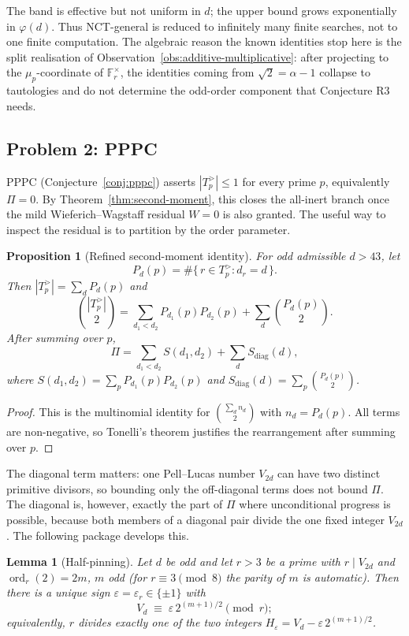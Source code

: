 \documentclass[11pt]{amsart}
\theoremstyle{plain}
\newtheorem{proposition}[theorem]{Proposition}
\newtheorem{lemma}[theorem]{Lemma}
\theoremstyle{definition}
\theoremstyle{remark}
\numberwithin{equation}{section}
\newcommand{\ord}{\operatorname{ord}}
\newcommand{\F}{\mathbb{F}}
\begin{document}
The band is effective but not uniform in $d$; the upper bound grows exponentially in $\varphi(d)$. Thus NCT-general is reduced to infinitely many finite searches, not to one finite computation. The algebraic reason the known identities stop here is the split realisation of Observation~\ref{obs:additive-multiplicative}: after projecting to the $\mu_p$-coordinate of $\F_r^\times$, the identities coming from $\sqrt2=\alpha-1$ collapse to tautologies and do not determine the odd-order component that Conjecture R3 needs.

\subsection{Problem 2: PPPC}\label{sec:pppc-problem}

PPPC (Conjecture~\ref{conj:pppc}) asserts $|T_p^{>}|\leq 1$ for every prime $p$, equivalently $\Pi=0$. By Theorem~\ref{thm:second-moment}, this closes the all-inert branch once the mild Wieferich--Wagstaff residual $W=0$ is also granted. The useful way to inspect the residual is to partition by the order parameter.

\begin{proposition}[Refined second-moment identity]\label{prop:refined-second-moment}
For odd admissible $d>43$, let
\[
  P_d(p)=\#\{\,r\in T_p^{>}: d_r=d\,\}.
\]
Then $|T_p^{>}|=\sum_d P_d(p)$ and
\[
  \binom{|T_p^{>}|}{2}
  =\sum_{d_1<d_2}P_{d_1}(p)P_{d_2}(p)
   +\sum_d \binom{P_d(p)}{2}.
\]
After summing over $p$,
\[
  \Pi=\sum_{d_1<d_2}S(d_1,d_2)+\sum_d S_{\mathrm{diag}}(d),
\]
where $S(d_1,d_2)=\sum_pP_{d_1}(p)P_{d_2}(p)$ and $S_{\mathrm{diag}}(d)=\sum_p\binom{P_d(p)}{2}$.
\end{proposition}

\begin{proof}
This is the multinomial identity for $\binom{\sum_d n_d}{2}$ with $n_d=P_d(p)$. All terms are non-negative, so Tonelli's theorem justifies the rearrangement after summing over $p$.
\end{proof}

The diagonal term matters: one Pell--Lucas number $V_{2d}$ can have two distinct primitive divisors, so bounding only the off-diagonal terms does not bound $\Pi$. The diagonal is, however, exactly the part of $\Pi$ where unconditional progress is possible, because both members of a diagonal pair divide the one fixed integer $V_{2d}$. The following package develops this.

\begin{lemma}[Half-pinning]\label{lem:half-pinning}
Let $d$ be odd and let $r > 3$ be a prime with $r \mid V_{2d}$ and $\ord_r(2) = 2m$, $m$ odd (for $r \equiv 3 \pmod 8$ the parity of $m$ is automatic). Then there is a unique sign $\varepsilon = \varepsilon_r \in \{\pm 1\}$ with
\[
  V_d \;\equiv\; \varepsilon \, 2^{(m+1)/2} \pmod r;
\]
equivalently, $r$ divides exactly one of the two integers $H_{\varepsilon} = V_d - \varepsilon\, 2^{(m+1)/2}$.
\end{lemma}
\end{document}
